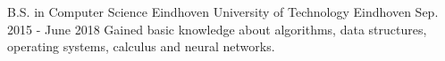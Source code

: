 
\begin{cventries}

  \cventry
    {B.S. in Computer Science} %
    {Eindhoven University of Technology} %
    {Eindhoven} %
    {Sep. 2015 - June 2018} %
    {
      {Gained basic knowledge about algorithms, data structures, operating systems, calculus and neural networks.}
    }

\end{cventries}
